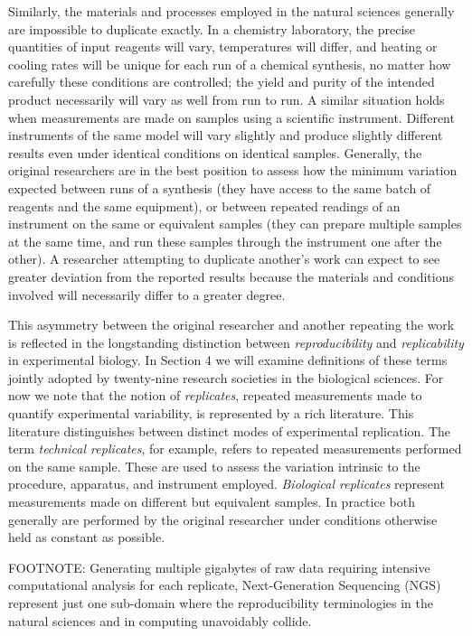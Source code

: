 Similarly, the materials and processes employed in the natural sciences generally are impossible
	to duplicate exactly.
In a chemistry laboratory, the precise quantities of input reagents will vary, temperatures will differ, and heating
	or cooling rates will be unique for each run of a chemical synthesis, no matter how carefully these conditions
	are controlled; the yield and purity of the intended product necessarily will vary as well from run to run.
A similar situation holds when measurements are made on samples using a scientific instrument. 
Different instruments of the same model will vary slightly and produce slightly different results even
	under identical conditions on identical samples.
Generally, the original researchers are in the best position to assess how the minimum variation expected
	between runs of a synthesis (they have access to the same batch of reagents and the same equipment), 
	or between repeated readings of an instrument on the same or equivalent samples (they can prepare
	multiple samples at the same time, and run these samples through the instrument one after the other).
A researcher attempting to duplicate another's work can expect to see greater deviation from the reported results	
	because the materials and conditions involved will necessarily differ to a greater degree.

This asymmetry between the original researcher and another repeating the work is reflected in the longstanding
	distinction between \emph{reproducibility} and \emph{replicability} in experimental biology.  
In Section 4 we will examine definitions of these terms jointly adopted by twenty-nine research
	societies in the biological sciences.  
For now we note that the notion of \emph{replicates}, repeated measurements made to quantify 
	experimental variability, is represented by a rich literature.
This literature distinguishes between distinct modes of experimental replication.
The term \emph{technical replicates}, for example, refers to repeated measurements performed on the same sample.
These are used to assess the variation intrinsic to the procedure, apparatus, and instrument employed.
\emph{Biological replicates} represent measurements made on different but equivalent samples.
In practice both generally are performed by the original researcher under conditions otherwise
	held as constant as possible.

FOOTNOTE: Generating multiple gigabytes of raw data requiring intensive computational analysis for each replicate, 
	Next-Generation Sequencing (NGS) represent just one sub-domain where the reproducibility 
	terminologies in the natural sciences and in computing unavoidably collide.